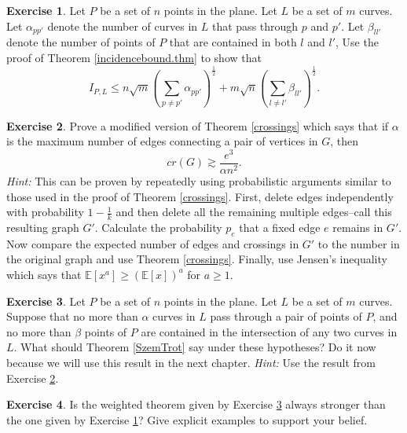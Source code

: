\documentclass[]{stml-l}
\numberwithin{equation}{chapter}
\theoremstyle{plain}
\theoremstyle{definition}
\newtheorem{exercise}{Exercise}[chapter]
\theoremstyle{remark}
\begin{document}
\begin{exercise} \label{ex3.4}
Let $P$ be a set of $n$ points in the plane. Let
$L$ be a set of $m$ curves. Let $\alpha_{pp'}$ denote the number of
curves in $L$ that pass through $p$ and $p'$. Let $\beta_{ll'}$ denote
the number of points of $P$ that are contained in both $l$ and $l'$,
Use the proof of Theorem \ref{incidencebound.thm} to show that
\begin{equation}
I_{P,L} \leq n \sqrt{m} {\left(\sum_{p \not=p'} \alpha_{pp'}\right)}
^{\frac{1}{2}} + m \sqrt{n} {\left(\sum_{l \not=l'}
\beta_{ll'}\right)}^{\frac{1}{2}}.
\end{equation}
 \end{exercise}

\begin{exercise} \label{ex3.5.1}
Prove a modified version of Theorem \ref{crossings} which says that if $\alpha$
is the maximum number of edges connecting a pair of vertices in $G$, then
\begin{equation}
cr(G) \gtrsim \frac{e^3}{\alpha n^2}.
\end{equation}
{\it Hint:}  This can be proven by repeatedly using probabilistic arguments similar to those used in the proof of Theorem \ref{crossings}.  First, delete edges independently with probability $1- \frac{1}{k}$ and then delete all the remaining multiple edges--call this resulting graph $G'$.  Calculate the probability $p_e$ that a fixed edge $e$ remains in $G'$.  Now compare the expected number of edges and crossings in $G'$ to the number in the original graph and use Theorem \ref{crossings}.  Finally, use Jensen's inequality which says that $\mathbb{E}[x^a] \geq (\mathbb{E}[x])^a$ for $a \geq 1$.
\end{exercise}


\begin{exercise} \label{ex3.5}
Let $P$ be a set of $n$ points in the plane. Let
$L$ be a set of $m$ curves. Suppose that no more than $\alpha$ curves
in $L$ pass through a pair of points of $P$, and no more than $\beta$ points
of $P$ are contained in the intersection of any two curves in $L$. What should
Theorem \ref{SzemTrot} say under these hypotheses? Do it now because we will use
this result in the next chapter.
{\it Hint:}  Use the result from Exercise \ref{ex3.5.1}.
\end{exercise}


\begin{exercise} \label{ex3.6}
Is the weighted theorem given by Exercise \ref{ex3.5} always
stronger than the one given by Exercise \ref{ex3.4}? Give explicit examples to
support your belief. \end{exercise}
\end{document}
